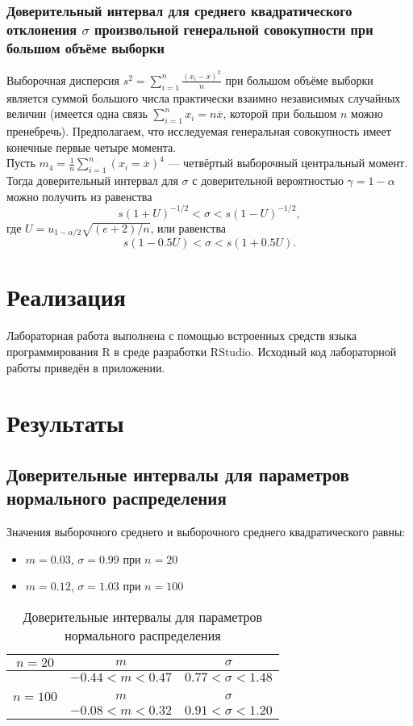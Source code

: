 \subsubsection{Доверительный интервал для среднего квадратического отклонения $\sigma$ произвольной генеральной совокупности при большом объёме выборки}
Выборочная дисперсия $s^2=\sum_{i=1}^n \frac{(x_i-\overline{x})^2}{n}$ при большом объёме выборки является суммой большого числа практически взаимно независимых случайных величин (имеется одна связь $\sum_{i=1}^n x_i=n\overline{x}$, которой при большом $n$ можно пренебречь). Предполагаем, что исследуемая генеральная совокупность имеет конечные первые четыре момента. \\
Пусть $m_4= \frac{1}{n} \sum_{i=1}^n (x_i=\overline{x})^4$ — четвёртый выборочный центральный момент. Тогда доверительный интервал для $\sigma$ с доверительной вероятностью $\gamma=1-\alpha$ можно получить из равенства
\begin{equation}
s(1+U)^{-1/2}<\sigma<s(1-U)^{-1/2},
\end{equation}
где $U=u_{1-\alpha/2}\sqrt{(e+2)/n}$, или равенства
\begin{equation}
s(1-0.5U)<\sigma<s(1+0.5U).
\end{equation} 

\section{Реализация}
Лабораторная работа выполнена с помощью встроенных средств языка программирования R в среде разработки RStudio. Исходный код лабораторной работы приведён в приложении.

\section{Результаты}
\subsection{Доверительные интервалы для параметров нормального распределения}
Значения выборочного среднего и выборочного среднего квадратического равны:
\begin{itemize}
	\item $m=0.03$, $\sigma=0.99$ при $n=20$
	\item $m=0.12$, $\sigma=1.03$ при $n=100$
\end{itemize}
\begin{table}[!ht]
	\centering
		\begin{tabular} {|c|c|c|}
			\hline
			$n=20$ & $m$ & $\sigma$ \\ \hline
			 & $-0.44<m<0.47$ & $0.77<\sigma<1.48$ \\ \hline
			 & & \\ \hline
			$n=100$ & $m$ & $\sigma$ \\ \hline
			 & $-0.08<m<0.32$ & $0.91<\sigma<1.20$ \\ \hline
		\end{tabular}
		\caption{Доверительные интервалы для параметров нормального распределения}
\end{table}

